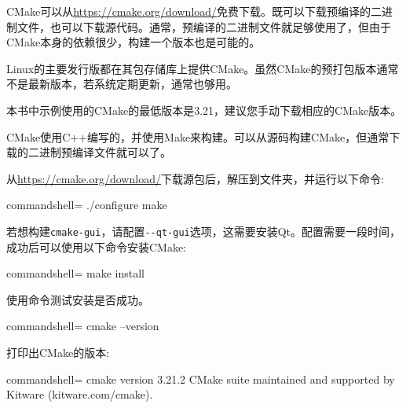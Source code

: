 CMake可以从\url{https://cmake.org/download/}免费下载。既可以下载预编译的二进制文件，也可以下载源代码。通常，预编译的二进制文件就足够使用了，但由于CMake本身的依赖很少，构建一个版本也是可能的。

Linux的主要发行版都在其包存储库上提供CMake。虽然CMake的预打包版本通常不是最新版本，若系统定期更新，通常也够用。

\begin{tcolorbox}[colback=webgreen!5!white,colframe=webgreen!75!black,title=Note]
本书中示例使用的CMake的最低版本是3.21，建议您手动下载相应的CMake版本。
\end{tcolorbox}


CMake使用C++编写的，并使用Make来构建。可以从源码构建CMake，但通常下载的二进制预编译文件就可以了。

从\url{https://cmake.org/download/}下载源包后，解压到文件夹，并运行以下命令:

\begin{tcblisting}{commandshell={}}
./configure make
\end{tcblisting}

若想构建\texttt{cmake-gui}，请配置\texttt{-{}-qt-gui}选项，这需要安装Qt。配置需要一段时间，成功后可以使用以下命令安装CMake:

\begin{tcblisting}{commandshell={}}
make install
\end{tcblisting}

使用命令测试安装是否成功。

\begin{tcblisting}{commandshell={}}
cmake --version
\end{tcblisting}

打印出CMake的版本:

\begin{tcblisting}{commandshell={}}
cmake version 3.21.2
CMake suite maintained and supported by Kitware (kitware.com/cmake).
\end{tcblisting}








































































